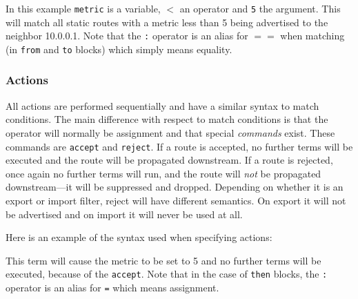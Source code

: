 In this example {\tt metric} is a variable, {\tt $<$} an operator and {\tt 5}
the argument.  This will match all static routes with a metric less than 5 being
advertised to the neighbor 10.0.0.1.  Note that the {\tt :} operator is an alias
for {\tt $==$} when matching (in {\tt from} and {\tt to} blocks) which simply
means equality.

\subsubsection{Actions}
All actions are performed sequentially and have a similar syntax to match
conditions. The main difference with respect to match conditions is that the
operator will normally be assignment and that special {\em commands} exist.
These commands are {\tt accept} and {\tt reject}.  If a route is accepted, no
further terms will be executed and the route will be propagated downstream.  If
a route is rejected, once again no further terms will run, and the route will {\em
not} be propagated downstream---it will be suppressed and dropped.  Depending on
whether it is an export or import filter, reject will have different semantics.
On export it will not be advertised and on import it will never be used at all.  

Here is an example of the syntax used when specifying actions:

\noindent{}

This term will cause the metric to be set to 5 and no further terms will be
executed, because of the {\tt accept}. Note that in the case of {\tt then}
blocks, the {\tt :} operator is an alias for {\tt =} which means assignment.

